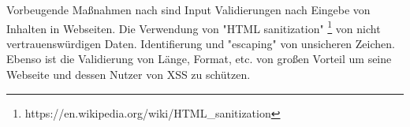 Vorbeugende Maßnahmen nach \textcite[3]{chaudhari2014} sind Input Validierungen nach Eingebe von Inhalten in Webseiten. Die Verwendung von "HTML sanitization" \footnote[]{https://en.wikipedia.org/wiki/HTML_sanitization} von nicht vertrauenswürdigen Daten. Identifierung und "escaping" von unsicheren Zeichen. Ebenso ist die Validierung von Länge, Format, etc. von großen Vorteil um seine Webseite und dessen Nutzer von XSS zu schützen.